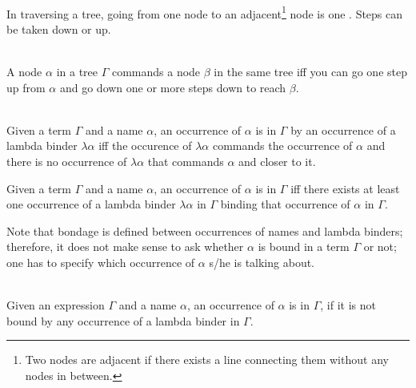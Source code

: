 \documentclass[11pt]{article}
\begin{document}
\medskip
{}\\
In traversing a tree, going from one node to an adjacent\footnote{Two nodes are adjacent if there exists a line connecting them without any nodes in between.} node is one . Steps can be taken down or up.

\medskip
{}\\
A node $\alpha$ in a tree $\Gamma$ commands a node $\beta$ in the same tree iff you can go one step up from $\alpha$ and go down one or more steps down to reach $\beta$.


\medskip
{}\\
Given a term $\Gamma$ and a name $\alpha$, an occurrence of $\alpha$ is  in $\Gamma$ by an occurrence of a lambda binder  $\lambda\alpha$ iff the occurence of $\lambda\alpha$ commands the occurrence of $\alpha$ and there is no occurrence of $\lambda\alpha$ that commands $\alpha$ and closer to it.

Given a term $\Gamma$ and a name $\alpha$, an occurrence of $\alpha$ is  in $\Gamma$ iff there exists at least one occurrence of a lambda binder $\lambda\alpha$ in $\Gamma$ binding that occurrence of $\alpha$  in $\Gamma$.

Note that bondage is defined between occurrences of names and lambda binders; therefore, it does not make sense to ask whether $\alpha$ is bound in a term $\Gamma$ or not; one has to specify which occurrence of $\alpha$ s/he is talking about.

\medskip
{}\\
Given an expression $\Gamma$ and a name $\alpha$, an occurrence of $\alpha$ is  in $\Gamma$, if it is not bound by any occurrence of a lambda binder in $\Gamma$. 


% 
% 
% 
\end{document}
